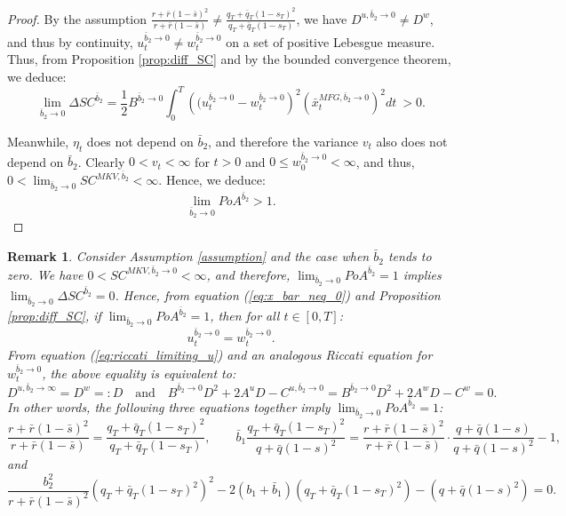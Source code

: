 \documentclass[11pt]{article}
\newtheorem{remark}{Remark}
\begin{document}
\begin{proof}
   	By the assumption $\frac{r + \bar{r}(1- \bar{s})^2}{r + \bar{r}(1-\bar{s})} \neq \frac{q_T+\bar{q}_T(1-s_T)^2}{q_T+\bar{q}_T(1-s_T)}$, we have $D^{u,\bar{b}_2 \to 0} \neq D^{w}$, and thus by continuity, $u^{\bar{b}_2 \to 0}_t\neq w^{\bar{b}_2 \to 0}_t$ on a set of positive Lebesgue measure. 
   	 Thus, from Proposition \ref{prop:diff_SC} and by the bounded convergence theorem, we deduce:
	\begin{equation*}
	\lim_{\bar{b}_2 \to 0} \Delta SC^{\bar{b}_2} = \frac{1}{2} B^{\bar{b}_2 \to 0} \int_0^T \left( (u_t^{\bar{b}_2 \to 0} - w_t^{\bar{b}_2 \to 0}\right)^2 \left (\bar{x}_t^{MFG,\bar{b}_2 \to 0} \right)^2 dt \  > 0. 
	\end{equation*}	
	
	Meanwhile, $\eta_t$ does not depend on $\bar{b}_2$, and therefore the variance $v_t$ also does not depend on $\bar{b}_2$. Clearly $0<v_t<\infty$ for $t>0$ and $0 \leq w^{\bar{b}_2 \to 0}_0 < \infty$, and thus,
	$ 0<\lim_{\bar{b}_2 \to 0}SC^{MKV,\bar{b}_2} <\infty.$
	Hence, we deduce:
	$$ \lim_{\bar{b}_2 \to 0} PoA^{\bar{b}_2} > 1. $$
\end{proof}

\begin{remark}
	Consider Assumption \ref{assumption} and the case when $\bar{b}_2$ tends to zero. We have $0< SC^{MKV, \bar{b}_2 \to 0} < \infty$, and therefore, $\lim_{\bar{b}_2 \to 0} PoA^{\bar{b}_2 } =1$ implies $\lim_{\bar{b}_2 \to 0} \Delta SC^{\bar{b}_2} = 0$. Hence, from equation (\ref{eq:x_bar_neq_0}) and Proposition \ref{prop:diff_SC}, if $\lim_{\bar{b}_2 \to 0} PoA^{\bar{b}_2 } =1$, then for all $t \in [0,T]$:
	$$u_t^{\bar{b}_2 \to 0} = w_t^{\bar{b}_2 \to 0}.$$
	From equation (\ref{eq:riccati_limiting_u}) and an analogous Riccati equation for $w_t^{\bar{b}_2 \to 0}$, the above equality is equivalent to:
	$$D^{u,\bar{b}_2 \to \infty} = D^w=:D \quad \text{and} \quad B^{\bar{b}_2 \to 0} D^2 + 2 A^{u}D - C^{u,\bar{b}_2 \to 0} = B^{\bar{b}_2 \to 0} D^2 + 2 A^{w} D - C^w  = 0.$$
	In other words, the following three equations together imply $\lim_{\bar{b}_2 \to 0} PoA^{\bar{b}_2 } =1$:
	$$	\frac{r + \bar{r}(1- \bar{s})^2}{r + \bar{r}(1-\bar{s})} = \frac{q_T+\bar{q}_T(1-s_T)^2}{q_T+\bar{q}_T(1-s_T)},
	\qquad
	 \bar{b}_1 \frac{q_T + \bar{q}_T(1-s_T)^2}{q + \bar{q}(1-s)^2} =  \frac{r + \bar{r}(1- \bar{s})^2}{r + \bar{r}(1-\bar{s})}\cdot \frac{q + \bar{q}(1-s)}{q + \bar{q}(1-s)^2}-1,
	$$
	and
	$$ \frac{b_2^2}{r + \bar{r}(1-\bar{s})^2} \left(q_T + \bar{q}_T(1- s_T)^2 \right)^2 - 2 (b_1 + \bar{b}_1) \left(q_T + \bar{q}_T(1- s_T)^2 \right) - \left(q + \bar{q}(1- s)^2 \right) = 0.$$\\
\label{remark_6}
\end{remark}
\end{document}
